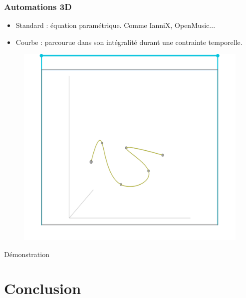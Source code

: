 \documentclass{beamer}
\begin{document}
\begin{frame}
    \frametitle{Automations 3D}\Large
    \begin{itemize}
        \item Standard : équation paramétrique. Comme IanniX, OpenMusic...
        \item Courbe : parcourue dans son intégralité durant une contrainte temporelle.
    \end{itemize}
    \begin{figure}
        \centering
        \includegraphics[scale=0.5]{images/autom3d.png}
    \end{figure}
\end{frame}

\begin{frame}
    \centering\huge
    Démonstration
\end{frame}

\section{Conclusion}
\end{document}
